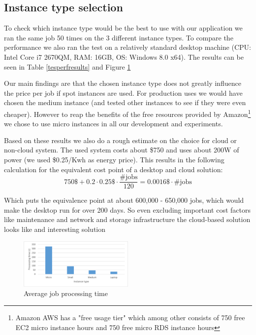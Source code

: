 \documentclass[a4paper]{IEEEtran}
\begin{document}
\subsection{Instance type selection}

To check which instance type would be the best to use with our application we ran the same job 50 times on the 3 different instance types. To compare the performance we also ran the test on a relatively standard desktop machine (CPU: Intel Core i7 2670QM, RAM: 16GB, OS: Windows 8.0 x64). The results can be seen in Table \ref{tesperfresults} and Figure \ref{fig_tesperfresults}

Our main findings are that the chosen instance type does not greatly influence the price per job if spot instances are used. For production uses we would have chosen the medium instance (and tested other instances to see if they were even cheaper). However to reap the benefits of the free resources provided by Amazon\footnote{Amazon AWS has a "free usage tier" which among other consists of 750 free EC2 micro instance hours and 750 free micro RDS instance hours} we chose to use micro instances in all our development and experiments.

Based on these results we also do a rough estimate on the choice for cloud or non-cloud system. The used system costs about \$750 and uses about 200W of power (we used \$0.25/Kwh as energy price). This results in the following calculation for the equivalent cost point of a desktop and cloud solution:
$$
750\$ + 0.2 \cdot 0.25\$ \cdot \frac{\text{\#jobs}}{120} = 0.0016\$ \cdot \text{\#jobs}
$$

Which puts the equivalence point at about 600,000 - 650,000 jobs, which would make the desktop run for over 200 days. So even excluding important cost factors like maintenance and network and storage infrastructure the cloud-based solution looks like and interesting solution 

\begin{figure}
\centering
\includegraphics[width=0.5\textwidth]{"results-tessaract"}
\caption{Average job processing time}
\label{fig_tesperfresults}
\end{figure}
\end{document}
